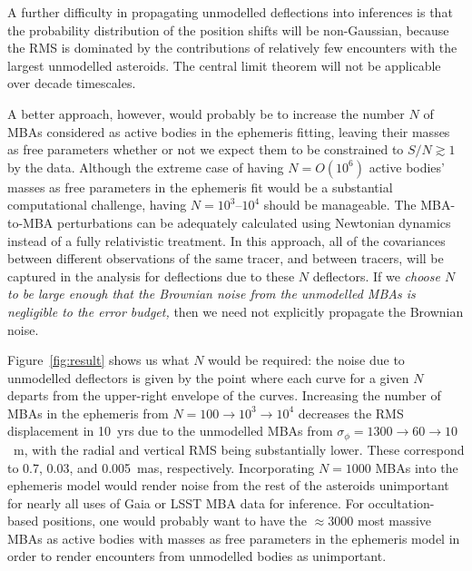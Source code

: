 \documentclass[linenumbers, onecolumn]{aastex631}
\begin{document}
A further difficulty in propagating unmodelled deflections into
inferences is that the probability distribution of the position shifts
will be non-Gaussian, because the RMS is dominated by the
contributions of relatively few encounters with the largest unmodelled
asteroids.  The central limit theorem will not be applicable over
decade timescales.

A better approach, however, would probably be to increase the number
$N$ of MBAs considered as active bodies in the ephemeris fitting,
leaving their masses as free parameters whether or not we expect them
to be constrained to $S/N\gtrsim1$ by the data.  Although the extreme
case of having $N=O(10^6)$ active bodies' masses as free parameters in
the ephemeris fit would be a substantial computational challenge,
having $N=10^3$--$10^4$ should be manageable.  The MBA-to-MBA perturbations can be adequately calculated using Newtonian dynamics instead of a fully relativistic treatment.  In this approach, all of the covariances between different observations of the same tracer, and between tracers, will be captured in the analysis for deflections due to these $N$ deflectors.  If we \emph{choose $N$ to be large enough that the Brownian noise from the unmodelled MBAs is negligible to the error budget,} then we need not explicitly propagate the Brownian noise.

Figure~\ref{fig:result} shows us what $N$ would be required: the noise due to unmodelled deflectors is given by the point where each curve for a given $N$ departs from the upper-right envelope of the curves.   Increasing the number of MBAs in the ephemeris from $N=100\rightarrow10^3\rightarrow10^4$ decreases the RMS displacement in 10~yrs due to the unmodelled MBAs from $\sigma_\phi=1300\rightarrow60\rightarrow10$~m, with the radial and vertical RMS being substantially lower.  These correspond to 0.7, 0.03, and 0.005~mas, respectively.  Incorporating $N=1000$ MBAs into the ephemeris model would render noise from the rest of the asteroids unimportant for nearly all uses of Gaia or LSST MBA data for inference.  For occultation-based positions, one would probably want to have the $\approx3000$ most massive MBAs as active bodies with masses as free parameters in the ephemeris model in order to render encounters from unmodelled bodies as unimportant.
\end{document}
